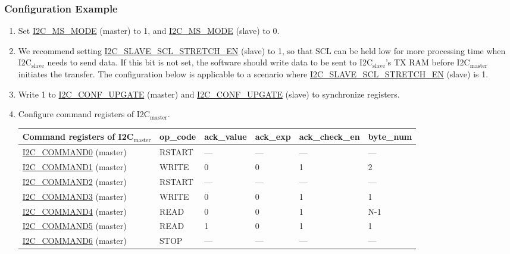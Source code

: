 \documentclass[main\_\_EN.tex]{subfiles}
\begin{document}
\subsubsection{Configuration Example}
\begin{enumerate}
\item Set \hyperref[fielddesc:I2CMSMODE]{I2C\_MS\_MODE} (master) to 1, and \hyperref[fielddesc:I2CMSMODE]{I2C\_MS\_MODE} (slave) to 0.
\item We recommend setting \hyperref[fielddesc:I2CSLAVESCLSTRETCHEN]{I2C\_SLAVE\_SCL\_STRETCH\_EN} (slave) to 1, so that SCL can be held low for more processing time when I2C$_\text{slave}$ needs to send data. If this bit is not set, the software should write data to be sent to I2C$_\text{slave}$'s TX RAM before I2C$_\text{master}$ initiates the transfer. The configuration below is applicable to a scenario where \hyperref[fielddesc:I2CSLAVESCLSTRETCHEN]{I2C\_SLAVE\_SCL\_STRETCH\_EN} (slave) is 1.
\item Write 1 to \hyperref[fielddesc:I2CCONFUPGATE]{I2C\_CONF\_UPGATE} (master) and \hyperref[fielddesc:I2CCONFUPGATE]{I2C\_CONF\_UPGATE} (slave) to synchronize registers.
\item Configure command registers of I2C$_\text{master}$.

\begin{longtable}{ | p{4cm} | p{2cm} | p{2cm} | p{2cm} |p{2cm} | p{2cm} |}
\hline\rowcolor{lightgray}
Command registers of I2C$_\text{master}$& op\_code & ack\_value&ack\_exp&ack\_check\_en&byte\_num  \\ \hline
\hyperref[fielddesc:I2CCOMMAND0]{I2C\_COMMAND0} (master)& RSTART& ---&---&---&---  \\ \hline
\hyperref[fielddesc:I2CCOMMAND1]{I2C\_COMMAND1} (master)& WRITE& 0&0&1&2  \\ \hline
\hyperref[fielddesc:I2CCOMMAND2]{I2C\_COMMAND2} (master)& RSTART& ---&---&---&---  \\ \hline
\hyperref[fielddesc:I2CCOMMAND3]{I2C\_COMMAND3} (master)& WRITE& 0&0&1&1  \\ \hline
\hyperref[fielddesc:I2CCOMMAND4]{I2C\_COMMAND4} (master)& READ& 0&0&1&N-1  \\ \hline
\hyperref[fielddesc:I2CCOMMAND5]{I2C\_COMMAND5} (master)& READ& 1&0&1&1  \\ \hline
\hyperref[fielddesc:I2CCOMMAND6]{I2C\_COMMAND6} (master)& STOP& ---&---&---&---  \\ \hline
\end{longtable}


\end{enumerate}
\end{document}
